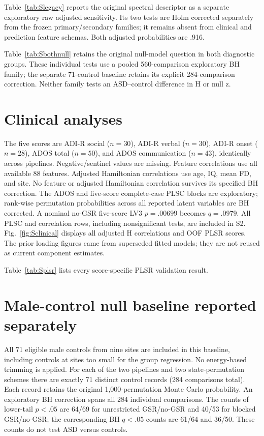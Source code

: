 \documentclass[10pt,letterpaper]{article}
\begin{document}


Table~\ref{tab:Slegacy} reports the original spectral descriptor as a separate
exploratory raw adjusted sensitivity. Its two tests are Holm corrected separately
from the frozen primary/secondary families; it remains absent from clinical and
prediction feature schemas. Both adjusted probabilities are .916.



Table~\ref{tab:Sbothnull} retains the original null-model question in both diagnostic
groups. These individual tests use a pooled 560-comparison exploratory BH family;
the separate 71-control baseline retains its explicit 284-comparison correction.
Neither family tests an ASD--control difference in H or null z.



\section*{Clinical analyses}
The five scores are ADI-R social ($n=30$), ADI-R verbal ($n=30$), ADI-R onset
($n=28$), ADOS total ($n=50$), and ADOS communication ($n=43$), identically across
pipelines. Negative/sentinel values are missing. Feature correlations use all
available 88 features. Adjusted Hamiltonian correlations use age, IQ, mean FD,
and site. No feature or adjusted Hamiltonian correlation survives its specified
BH correction. The ADOS and five-score complete-case PLSC blocks are exploratory;
rank-wise permutation probabilities across all reported latent variables are
BH corrected. A nominal no-GSR five-score LV3 $p=.00699$ becomes $q=.0979$.
All PLSC and correlation rows, including nonsignificant tests, are included in S2.
Fig.~\ref{fig:Sclinical} displays all adjusted H correlations and OOF PLSR scores.
The prior loading figures came from superseded fitted models; they are not
reused as current component estimates.

Table~\ref{tab:Splsr} lists every score-specific PLSR validation result.


\section*{Male-control null baseline reported separately}
All 71 eligible male controls from nine sites are included in this baseline,
including controls at sites too small for the group regression. No energy-based
trimming is applied. For each of the two pipelines and two state-permutation
schemes there are exactly 71 distinct control records (284 comparisons total).
Each record retains the original 1,000-permutation Monte Carlo probability.
An exploratory BH correction spans all 284 individual comparisons. The counts
of lower-tail $p<.05$ are 64/69 for unrestricted GSR/no-GSR and 40/53 for blocked
GSR/no-GSR; the corresponding BH $q<.05$ counts are 61/64 and 36/50.
These counts do not test ASD versus controls.
\end{document}
